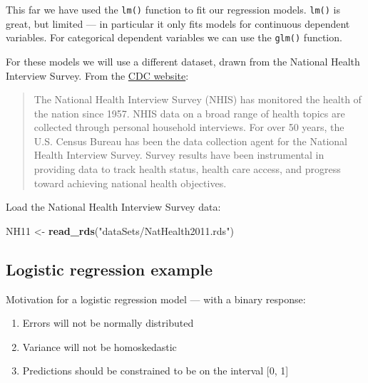 \documentclass[
]{book}
\newenvironment{Shaded}{\begin{snugshade}}{\end{snugshade}}
\newcommand{\KeywordTok}[1]{\textcolor[rgb]{0.13,0.29,0.53}{\textbf{#1}}}
\newcommand{\NormalTok}[1]{#1}
\newcommand{\StringTok}[1]{\textcolor[rgb]{0.31,0.60,0.02}{#1}}
\providecommand{\tightlist}{%
  \setlength{\itemsep}{0pt}\setlength{\parskip}{0pt}}
\begin{document}
This far we have used the \texttt{lm()} function to fit our regression models. \texttt{lm()} is great, but limited --- in particular it only fits models for continuous dependent variables. For categorical dependent variables we can use the \texttt{glm()} function.

For these models we will use a different dataset, drawn from the National Health Interview Survey. From the \href{http://www.cdc.gov/nchs/nhis.htm}{CDC website}:

\begin{quote}
The National Health Interview Survey (NHIS) has monitored the health of the nation since 1957. NHIS data on a broad range of health topics are collected through personal household interviews. For over 50 years, the U.S. Census Bureau has been the data collection agent for the National Health Interview Survey. Survey results have been instrumental in providing data to track health status, health care access, and progress toward achieving national health objectives.
\end{quote}

Load the National Health Interview Survey data:

\begin{Shaded}
\begin{Highlighting}[]
\NormalTok{  NH11 <-}\StringTok{ }\KeywordTok{read_rds}\NormalTok{(}\StringTok{"dataSets/NatHealth2011.rds"}\NormalTok{)}
\end{Highlighting}
\end{Shaded}

\hypertarget{logistic-regression-example}{%
\subsection{Logistic regression example}\label{logistic-regression-example}}

Motivation for a logistic regression model --- with a binary response:

\begin{enumerate}
\def\labelenumi{\arabic{enumi}.}
\tightlist
\item
  Errors will not be normally distributed
\item
  Variance will not be homoskedastic
\item
  Predictions should be constrained to be on the interval {[}0, 1{]}
\end{enumerate}
\end{document}
